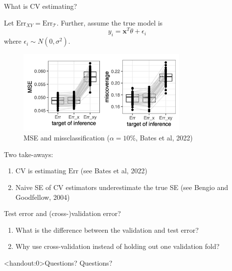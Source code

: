 \documentclass[10pt]{beamer}
\begin{document}
\begin{frame}{What is CV estimating?}

Let $\text{Err}_{XY} = \text{Err}_\mathcal{T}$. Further, assume the true model is
\[
y_i = \mathbf{x}^T \theta + \epsilon_i
\]
where $\epsilon_i \sim N(0,\sigma^2)$.

\begin{figure}[h]
\caption{MSE and missclassification ($\alpha=10\%$, Bates et al, 2022)}
\vspace{-5mm}
\centering
\includegraphics[width=0.75\textwidth]{figs/bales2021}
\vspace{-5mm}
\end{figure}
\pause
Two take-aways:
\vspace{-2mm}
\begin{enumerate}
\item CV is estimating $\text{Err}$ (see Bates et al, 2022)
\pause
\item Naive SE of CV estimators underestimate the true SE (see Bengio and Goodfellow, 2004)
\end{enumerate}


\end{frame}


\begin{frame}{Test error and (cross-)validation error?}

\begin{enumerate}
\item What is the difference between the validation and test error?
\pause
\item Why use cross-validation instead of holding out one validation fold?
\end{enumerate}

\end{frame}

\begin{frame}<handout:0>{Questions?}
Questions?
\end{frame}




\end{document}
